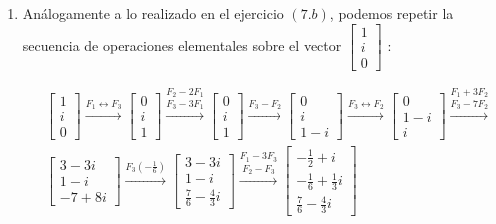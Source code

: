 \documentclass[12pt,reqno]{amsart}
\begin{document}
\begin{enumerate}
\begin{enumerate}
\

\item Análogamente a lo realizado en el  ejercicio $(7.b)$, podemos repetir la secuencia de operaciones elementales sobre el vector $\left[\begin{array}{c}1\\i\\0 \end{array}\right]$ :

\begin{align*}
& \left[\begin{array}{c}1\\i\\0 \end{array}\right]
\stackrel{F_1 \leftrightarrow F_3}{\longrightarrow}
\left[\begin{array}{c}0\\i\\1 \end{array}\right]
\stackrel{F_2 - 2 F_1}{\stackrel{F_3 - 3 F_1}{\longrightarrow}}
\left[\begin{array}{c}0\\i\\1 \end{array}\right]
\stackrel{F_3-F_2}{\longrightarrow}
\left[\begin{array}{c}0\\i\\1-i \end{array}\right]
\stackrel{F_3 \leftrightarrow F_2}{\longrightarrow} 
\left[\begin{array}{c}0\\1-i\\i \end{array}\right]
\stackrel{F_1 + 3 F_2}{\stackrel{F_3-7F_2}{\longrightarrow}} \\
&\left[\begin{array}{c} 3 - 3i \\1-i\\ -7 + 8i \end{array}\right]
\stackrel{F_3 (-\frac{1}{6}) }{\longrightarrow}
\left[\begin{array}{c} 3 - 3i \\1-i\\ \frac{7}{6} - \frac{4}{3} i \end{array}\right]
\stackrel{F_1 - 3 F_3}{\stackrel{F_2 - F_3 }{\longrightarrow}}
\left[\begin{array}{c} -\frac{1}{2}+i \\ -\frac{1}{6}+\frac{1}{3}i \\ \frac{7}{6}-\frac{4}{3} i \end{array}\right]
\end{align*}


\end{enumerate}
\end{enumerate}
\end{document}
